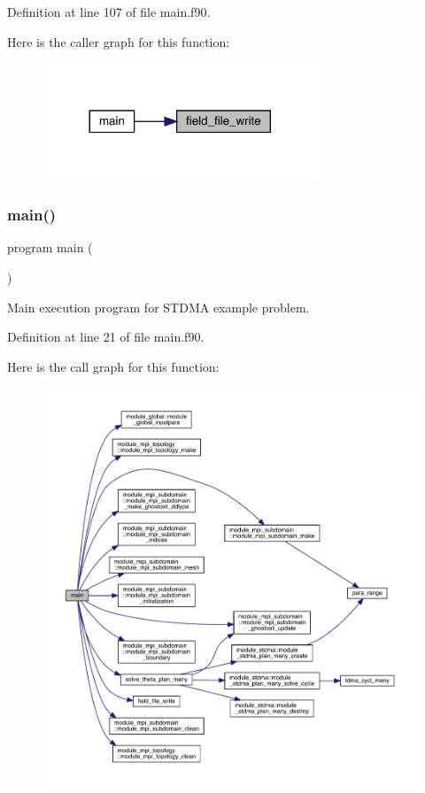 Definition at line 107 of file main.\+f90.

Here is the caller graph for this function\+:\nopagebreak
\begin{figure}[H]
\begin{center}
\leavevmode
\includegraphics[width=233pt]{main_8f90_af0a1310807f21ee1a2c0fdf14c58b63b_icgraph}
\end{center}
\end{figure}
\mbox{\label{main_8f90_a8ec2266d83cd6c0b762cbcbc92c0af3d}} 
\subsubsection{\texorpdfstring{main()}{main()}}
{\footnotesize\ttfamily program main (\begin{DoxyParamCaption}{ }\end{DoxyParamCaption})}



Main execution program for S\+T\+D\+MA example problem. 



Definition at line 21 of file main.\+f90.

Here is the call graph for this function\+:\nopagebreak
\begin{figure}[H]
\begin{center}
\leavevmode
\includegraphics[width=350pt]{main_8f90_a8ec2266d83cd6c0b762cbcbc92c0af3d_cgraph}
\end{center}
\end{figure}
